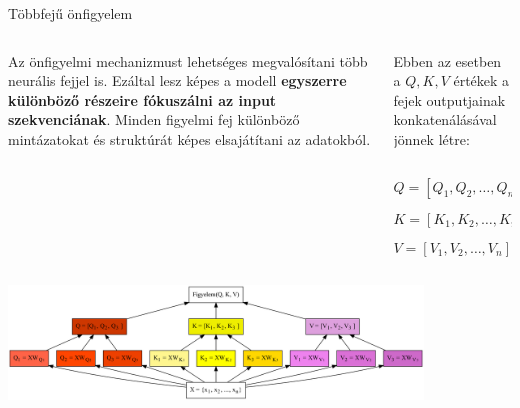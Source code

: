 \documentclass[english, aspectratio=169]{beamer}
\begin{document}
\begin{frame}{Többfejű önfigyelem}
\begin{columns}
\begin{column}{.4\textwidth}
Az önfigyelmi mechanizmust lehetséges megvalósítani több neurális fejjel is. Ezáltal lesz képes a modell \textbf{egyszerre különböző részeire fókuszálni az input szekvenciának}. Minden figyelmi fej különböző mintázatokat és struktúrát képes elsajátítani az adatokból. 
\end{column}
\begin{column}{.6\textwidth}
Ebben az esetben a $Q,K,V$ értékek a fejek outputjainak konkatenálásával jönnek létre:
\begin{column}{.2\textwidth}
\end{column}
\begin{column}{.6\textwidth}
\begin{block}{}
\vspace{-0.2cm}
\[
Q=\left[ Q_1,Q_2,\ldots,Q_n \right]
\]
\end{block}
\vspace{-0.2cm}
\begin{block}{}
\vspace{-0.6cm}
\[
K=\left[ K_1,K_2,\ldots,K_n \right]
\]
\end{block}
\vspace{-0.2cm}
\begin{block}{}
\vspace{-0.2cm}
\[
V=\left[ V_1,V_2,\ldots,V_n \right]
\]
\end{block}
\end{column}
\begin{column}{.2\textwidth}
\end{column}
\end{column}
\end{columns}
\begin{center}
\includegraphics[width=11cm, keepaspectratio]{graphs/transformer_19.png}
\end{center}
\end{frame}
\end{document}
